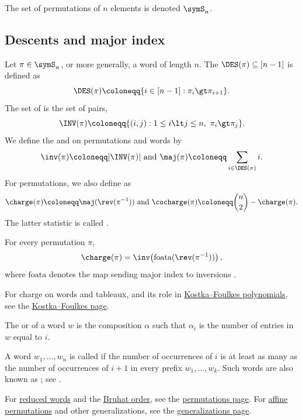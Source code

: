 The set of permutations of $n$ elements is denoted $\symS_n$.

\subsection[descentsMajorIndex]{Descents and major index}

Let $\pi \in \symS_n$, or more generally, a word of length $n$.
The \label{descentSet} $\DES(\pi)\subseteq [n-1]$
is defined as 
\[
\DES(\pi) \coloneqq \{i \in [n-1] : \pi_i \gt \pi_{i+1} \}.
\]
The set of \label{inversionSet} is the set of pairs,
\[
\INV(\pi) \coloneqq \{(i,j) : 1\leq i\lt j\leq n,\ \pi_i \gt \pi_{j} \}.
\]
We define the \label{inversionNumber} and
\label{majorIndex} on permutations and words by
\[
\inv(\pi) \coloneqq |\INV(\pi)| \text{ and } \maj(\pi) \coloneqq \sum_{i \in \DES(\pi)} i.
\]
For permutations, we also define \label{permutationChargeStatistic} as
\[
\charge(\pi) \coloneqq \maj(\rev(\pi^{-1})) \text{ and }
\cocharge(\pi) \coloneqq \binom{n}{2} - \charge(\pi).
\]
The latter statistic is called \label{permutationCochargeStatistic}.

\begin{lemma}
For every permutation $\pi$,
\[
\charge(\pi) = \inv\!\left(\mathrm{foata}(\rev(\pi^{-1}))\right),
\]
where $\mathrm{foata}$ denotes the map sending major index to inversions \cite{Foata1968}.
\end{lemma}

For charge on words and tableaux, and its role in
\hyperref[kostkaFoulkes]{Kostka--Foulkes polynomials}, see the
\hyperref[kostkaFoulkes]{Kostka--Foulkes page}.



The \label{wordWeight} or  of a word $w$ is the
composition $\alpha$
such that $\alpha_i$ is the number of entries in $w$ equal to $i$.

A word $w_1,\dotsc,w_n$ is called \label{yamanouchiWord} if
the number of occurrences of $i$ is at least as many as the number of
occurrences of $i+1$ in every prefix $w_1,\dotsc,w_k$.
Such words are also known as \label{ballotWord}; see
.

For \hyperref[reducedWord]{reduced words} and the \hyperref[bruhatOrder]{Bruhat order},
see the \hyperref[permutationMatrix]{permutations page}.
For \hyperref[notationAffinePermutations]{affine permutations} and other generalizations,
see the \hyperref[notationAffinePermutations]{generalizations page}.


